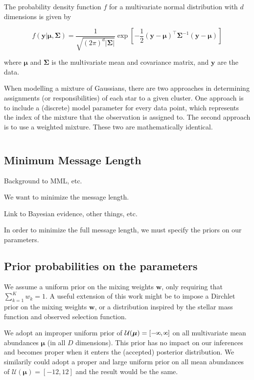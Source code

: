 \documentclass{aastex61}
\def\infinity{\rotatebox{90}{8}}
\begin{document}
The probability density function $f$ for a multivariate normal distribution 
with $d$ dimensions is given by

\begin{equation}
    f(\bm{y}|\bm{\mu},\bm{\Sigma}) 
        = \frac{1}{\sqrt{(2\pi)^d|\bm{\Sigma}|}}
          \exp{\left[-\frac{1}{2}(\bm{y} - \bm{\mu})^\intercal\bm{\Sigma}^{-1}(\bm{y} - \bm{\mu})\right]}
\end{equation}

\noindent{}where $\bm{\mu}$ and $\bm{\Sigma}$ is the multivariate mean and 
covariance matrix, and $\bm{y}$ are the data.  



When modelling a mixture of
Gaussians, there are two approaches in determining assignments (or
responsibilities) of each star to a given cluster. One approach is to include
a (discrete) model parameter for every data point, which represents the index
of the mixture that the observation is assigned to. The second approach is to 
use a weighted mixture. These two are mathematically identical.


\begin{equation}
\end{equation}


\subsection{Minimum Message Length}
\label{sec:mml}

Background to MML, etc.

We want to minimize the message length.

Link to Bayesian evidence, other things, etc.

In order to minimize the full message length, we must specify the priors on
our parameters.


\subsection{Prior probabilities on the parameters}


We assume a uniform prior on the mixing weights $\bm{w}$, only requiring that
$\sum_{k=1}^{K}w_k = 1$. A useful extension of this work might be to impose
a Dirchlet prior on the mixing weights $\bm{w}$, or a distribution inspired by
the stellar mass function and observed selection function.


We adopt an improper uniform prior of 
$\mathcal{U}(\bm{\mu}) = [-\infinity, \infinity]$ on all multivariate mean 
abundances $\bm{\mu}$ (in all $D$ dimensions). This prior has no impact on
our inferences and becomes proper when it enters the (accepted) posterior
distribution. We similarily could adopt a proper and large uniform prior on all 
mean abundances of $\mathcal{U}(\bm{\mu}) = [-12, 12]$ and the result would be
the same.
\end{document}
